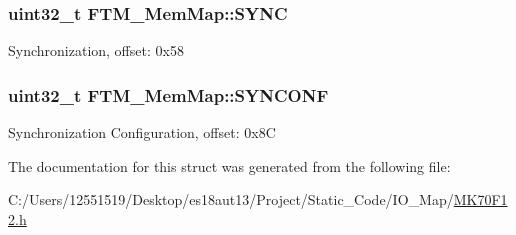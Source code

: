 \subsubsection[{S\+Y\+N\+C}]{\setlength{\rightskip}{0pt plus 5cm}uint32\+\_\+t F\+T\+M\+\_\+\+Mem\+Map\+::\+S\+Y\+N\+C}\label{struct_f_t_m___mem_map_a9537a55fae48de4811bfe7600d37b230}
Synchronization, offset\+: 0x58 \hypertarget{struct_f_t_m___mem_map_a3bd4b174127a80c7f8bd910b66e6de60}{}
\subsubsection[{S\+Y\+N\+C\+O\+N\+F}]{\setlength{\rightskip}{0pt plus 5cm}uint32\+\_\+t F\+T\+M\+\_\+\+Mem\+Map\+::\+S\+Y\+N\+C\+O\+N\+F}\label{struct_f_t_m___mem_map_a3bd4b174127a80c7f8bd910b66e6de60}
Synchronization Configuration, offset\+: 0x8\+C 

The documentation for this struct was generated from the following file\+:\begin{DoxyCompactItemize}
\item 
C\+:/\+Users/12551519/\+Desktop/es18aut13/\+Project/\+Static\+\_\+\+Code/\+I\+O\+\_\+\+Map/\hyperlink{_m_k70_f12_8h}{M\+K70\+F12.\+h}\end{DoxyCompactItemize}
